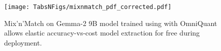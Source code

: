 \begin{figure}[!b]
  \centering
  \vspace{-5mm}
        \texttt{[image: TabsNFigs/mixnmatch\_pdf\_corrected.pdf]}
        \vspace{-3mm}
        \caption{Mix'n'Match on Gemma-2 9B model trained using \alg with OmniQuant allows elastic accuracy-vs-cost model extraction for free during deployment.}
\label{fig:omniquant-mnm}
\end{figure}